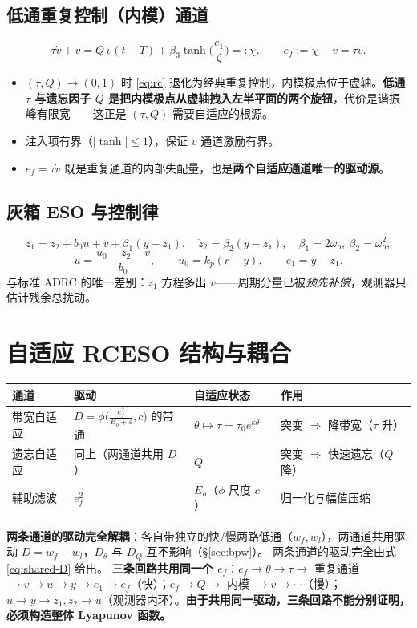 \documentclass[11pt]{article}
\theoremstyle{remark}\newtheorem{remark}{注}
\newcommand{\ef}{e_f}
\newcommand{\st}{\operatorname{tanh}}
\begin{document}
\subsection{低通重复控制（内模）通道}
\begin{equation}
  \tau\dot v+v = Q\,v(t-T)+\beta_3\st\!\Big(\frac{e_1}{\zeta}\Big)=:\chi,
  \qquad \ef := \chi-v = \tau\dot v .
  \label{eq:rc}
\end{equation}
\begin{itemize}
  \item $(\tau,Q)\to(0,1)$ 时 \eqref{eq:rc} 退化为经典重复控制，内模极点位于虚轴。\textbf{低通 $\tau$ 与遗忘因子 $Q$ 是把内模极点从虚轴拽入左半平面的两个旋钮}，代价是谐振峰有限宽——这正是 $(\tau,Q)$ 需要自适应的根源。
  \item 注入项有界（$|\st|\le1$），保证 $v$ 通道激励有界。
  \item $\ef=\tau\dot v$ 既是重复通道的内部失配量，也是\textbf{两个自适应通道唯一的驱动源}。
\end{itemize}
\subsection{灰箱 ESO 与控制律}
\begin{equation}
  \dot z_1 = z_2+b_0u+v+\beta_1(y-z_1),\quad \dot z_2 = \beta_2(y-z_1),\quad \beta_1=2\omega_o,\ \beta_2=\omega_o^2,
\end{equation}
\begin{equation}
  u = \frac{u_0-z_2-v}{b_0},\qquad u_0 = k_p(r-y),\qquad e_1 = y-z_1 .
\end{equation}
与标准 ADRC 的唯一差别：$z_1$ 方程多出 $v$——周期分量已被\emph{预先补偿}，观测器只估计残余总扰动。
\section{自适应 RCESO 结构与耦合}\label{sec:arch}
\begin{center}
\small
\begin{tabular}{@{}llll@{}}
\toprule
通道 & 驱动 & 自适应状态 & 作用\\
\midrule
带宽自适应 & $D=\phi\!\big(\frac{\ef^{2}}{E_o+\varepsilon},c\big)$ 的带通 & $\theta\mapsto\tau=\tau_0e^{\kappa\theta}$ & 突变 $\Rightarrow$ 降带宽（$\tau$ 升）\\
遗忘自适应 & 同上（两通道共用 $D$） & $Q$ & 突变 $\Rightarrow$ 快速遗忘（$Q$ 降）\\
辅助滤波 & $\ef^{2}$ & $E_o$（$\phi$ 尺度 $c$） & 归一化与幅值压缩\\
\bottomrule
\end{tabular}
\end{center}
\noindent\textbf{两条通道的驱动完全解耦}：各自带独立的快/慢两路低通（$w_f,w_l$），两通道共用驱动 $D=w_f-w_l$，$D_\theta$ 与 $D_Q$ 互不影响（\S\ref{sec:bpw}）。
两条通道的驱动完全由式 \eqref{eq:shared-D} 给出。
\noindent\textbf{三条回路共用同一个 $\ef$}：$\ef\to\theta\to\tau\to$ 重复通道 $\to v\to u\to y\to e_1\to\ef$（快）；$\ef\to Q\to$ 内模 $\to v\to\cdots$（慢）；$u\to y\to z_1,z_2\to u$（观测器内环）。\textbf{由于共用同一驱动，三条回路不能分别证明，必须构造整体 Lyapunov 函数。}
\end{document}
